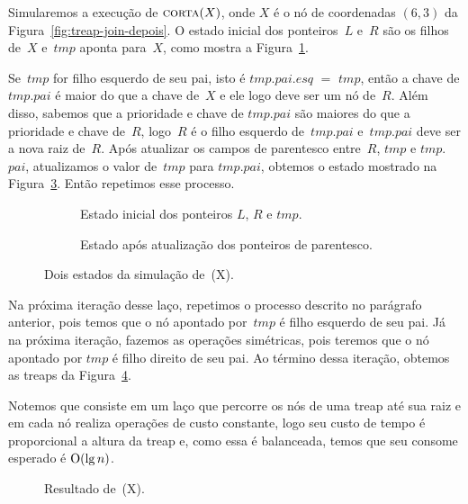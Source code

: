 Simularemos a execução de $\text{\scshape corta}(X)$, onde $X$ é o nó de coordenadas $(6,3)$ da Figura~\ref{fig:treap-join-depois}.
O estado inicial dos ponteiros~$L$ e~$R$ são os filhos de~$X$ e~$tmp$ aponta para~$X$, como mostra a Figura~\ref{fig:treap-split-1}.

Se~$tmp$ for filho esquerdo de seu pai, isto é $tmp$.$pai$.$esq$ $=$ $tmp$, então a chave de $tmp$.$pai$ é maior do que a chave de~$X$ e ele logo deve ser um nó de~$R$.
Além disso, sabemos que a prioridade e chave de $tmp$.$pai$ são maiores do que a prioridade e chave de~$R$,
logo~$R$ é o filho esquerdo de~$tmp$.$pai$ e~$tmp$.$pai$ deve ser a nova raiz de~$R$. 
Após atualizar os campos de parentesco entre~$R$, $tmp$ e $tmp$.$pai$, atualizamos o valor de~$tmp$ para $tmp$.$pai$, obtemos o estado mostrado na Figura~\ref{fig:treap-split-2}.
Então repetimos esse processo. 

\begin{figure}[htb]
\begin{subfigure}{0.3\textwidth}

\caption{Estado inicial dos ponteiros $L$, $R$ e $tmp$.}
\label{fig:treap-split-1}
\end{subfigure}
\hspace{3cm}
\begin{subfigure}{0.3\textwidth}

\caption{Estado após atualização dos ponteiros de parentesco.}
\label{fig:treap-split-2}
\end{subfigure}
\caption{Dois estados da simulação de~\treapSplit(X).}
\end{figure}

Na próxima iteração desse laço, repetimos o processo descrito no parágrafo anterior, pois temos que o nó apontado por~$tmp$ é filho esquerdo de seu pai.
Já na próxima iteração, fazemos as operações simétricas, pois teremos que o nó apontado por $tmp$ é filho direito de seu pai.
Ao término dessa iteração, obtemos as treaps da Figura~\ref{fig:treap-split-final}.

Notemos que \treapSplit{} consiste em um laço que percorre os nós de uma treap até sua raiz e em cada nó realiza operações de custo constante, logo seu custo de tempo é proporcional a altura da treap e, como essa é balanceada, temos que seu consome esperado é $\mathrm{O}(\lg n)$.

\begin{figure}[htb]
\centering

\caption{Resultado de~\treapSplit(X).}
\label{fig:treap-split-final}
\end{figure}
